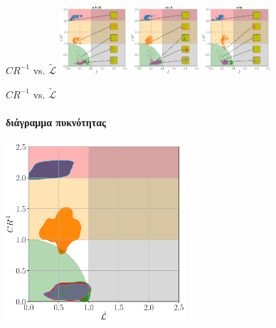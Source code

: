 \documentclass{beamer}
\begin{document}
\begin{frame}[c]{$CR^{-1}$ \textlatin{vs}. $\tilde{\mathcal{L}}$}
	\includegraphics[width=0.19\textwidth]{"images_mean_inverse_compression_ratio_vs_mean_reconstruction_loss_variable_kernel_size_list/sufhsdb"}
	\includegraphics[width=0.19\textwidth]{"images_mean_inverse_compression_ratio_vs_mean_reconstruction_loss_variable_kernel_size_list/voiced"}
	\includegraphics[width=0.19\textwidth]{"images_mean_inverse_compression_ratio_vs_mean_reconstruction_loss_variable_kernel_size_list/wrist"}
\end{frame}

\begin{frame}[c]{$CR^{-1}$ \textlatin{vs}. $\tilde{\mathcal{L}}$}
	\framesubtitle{διάγραμμα πυκνότητας}
	\includegraphics[width=0.5\textwidth]{"images_1d/crrl_density_plot"}
\end{frame}
\end{document}
